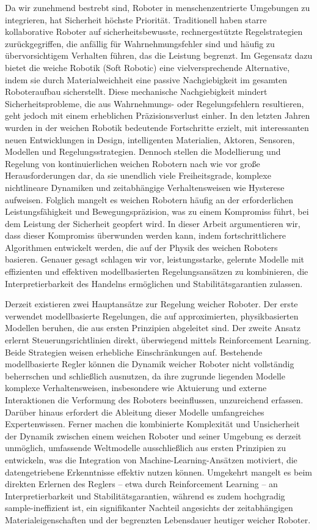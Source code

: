 {
Da wir zunehmend bestrebt sind, Roboter in menschenzentrierte Umgebungen zu integrieren, hat Sicherheit höchste Priorität. Traditionell haben starre kollaborative Roboter auf sicherheitsbewusste, rechnergestützte Regelstrategien zurückgegriffen, die anfällig für Wahrnehmungsfehler sind und häufig zu übervorsichtigem Verhalten führen, das die Leistung begrenzt. Im Gegensatz dazu bietet die weiche Robotik (Soft Robotic) eine vielversprechende Alternative, indem sie durch Materialweichheit eine passive Nachgiebigkeit im gesamten Roboteraufbau sicherstellt. Diese mechanische Nachgiebigkeit mindert Sicherheitsprobleme, die aus Wahrnehmungs- oder Regelungsfehlern resultieren, geht jedoch mit einem erheblichen Präzisionsverlust einher. In den letzten Jahren wurden in der weichen Robotik bedeutende Fortschritte erzielt, mit interessanten neuen Entwicklungen in Design, intelligenten Materialien, Aktoren, Sensoren, Modellen und Regelungsstrategien. Dennoch stellen die Modellierung und Regelung von kontinuierlichen weichen Robotern nach wie vor große Herausforderungen dar, da sie unendlich viele Freiheitsgrade, komplexe nichtlineare Dynamiken und zeitabhängige Verhaltensweisen wie Hysterese aufweisen. Folglich mangelt es weichen Robotern häufig an der erforderlichen Leistungsfähigkeit und Bewegungspräzision, was zu einem Kompromiss führt, bei dem Leistung der Sicherheit geopfert wird. In dieser Arbeit argumentieren wir, dass dieser Kompromiss überwunden werden kann, indem fortschrittlichere Algorithmen entwickelt werden, die auf der Physik des weichen Roboters basieren. Genauer gesagt schlagen wir vor, leistungsstarke, gelernte Modelle mit effizienten und effektiven modellbasierten Regelungsansätzen zu kombinieren, die Interpretierbarkeit des Handelns ermöglichen und Stabilitätsgarantien zulassen.

Derzeit existieren zwei Hauptansätze zur Regelung weicher Roboter. Der erste verwendet modellbasierte Regelungen, die auf approximierten, physikbasierten Modellen beruhen, die aus ersten Prinzipien abgeleitet sind. Der zweite Ansatz erlernt Steuerungsrichtlinien direkt, überwiegend mittels Reinforcement Learning. Beide Strategien weisen erhebliche Einschränkungen auf. Bestehende modellbasierte Regler können die Dynamik weicher Roboter nicht vollständig beherrschen und schließlich ausnutzen, da ihre zugrunde liegenden Modelle komplexe Verhaltensweisen, insbesondere wie Aktuierung und externe Interaktionen die Verformung des Roboters beeinflussen, unzureichend erfassen. Darüber hinaus erfordert die Ableitung dieser Modelle umfangreiches Expertenwissen. Ferner machen die kombinierte Komplexität und Unsicherheit der Dynamik zwischen einem weichen Roboter und seiner Umgebung es derzeit unmöglich, umfassende Weltmodelle ausschließlich aus ersten Prinzipien zu entwickeln, was die Integration von Machine-Learning-Ansätzen motiviert, die datengetriebene Erkenntnisse effektiv nutzen können. Umgekehrt mangelt es beim direkten Erlernen des Reglers – etwa durch Reinforcement Learning – an Interpretierbarkeit und Stabilitätsgarantien, während es zudem hochgradig sample-ineffizient ist, ein signifikanter Nachteil angesichts der zeitabhängigen Materialeigenschaften und der begrenzten Lebensdauer heutiger weicher Roboter.

}

